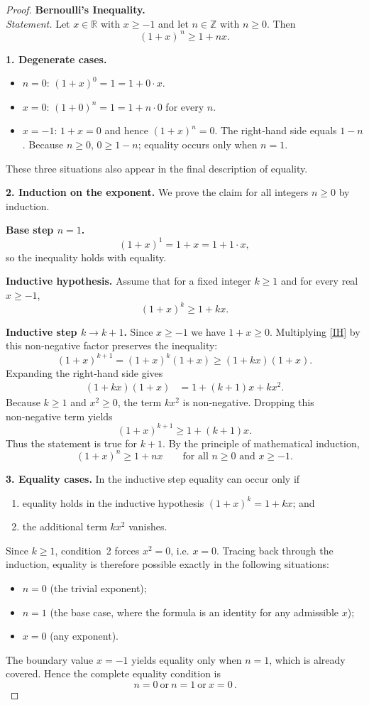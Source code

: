 \begin{proof}
\textbf{Bernoulli’s Inequality.}\\
\textit{Statement.} Let $x\in\mathbb{R}$ with $x\ge -1$ and let $n\in\mathbb{Z}$ with $n\ge 0$. Then
\[
(1+x)^{\,n}\ge 1+ n x .
\]

\medskip
\textbf{1. Degenerate cases.}
\begin{itemize}
\item $n=0$: $(1+x)^{0}=1=1+0\cdot x$.
\item $x=0$: $(1+0)^{n}=1=1+n\cdot0$ for every $n$.
\item $x=-1$: $1+x=0$ and hence $(1+x)^{n}=0$. The right‑hand side equals $1-n$. Because $n\ge0$, $0\ge 1-n$; equality occurs only when $n=1$.
\end{itemize}
These three situations also appear in the final description of equality.

\medskip
\textbf{2. Induction on the exponent.}
We prove the claim for all integers $n\ge0$ by induction.

\textbf{Base step $n=1$.}
\[
(1+x)^{1}=1+x=1+1\cdot x ,
\]
so the inequality holds with equality.

\textbf{Inductive hypothesis.}
Assume that for a fixed integer $k\ge1$ and for every real $x\ge-1$,
\begin{equation}\label{IH}
(1+x)^{k}\ge 1+kx .
\end{equation}

\textbf{Inductive step $k\to k+1$.}
Since $x\ge-1$ we have $1+x\ge0$. Multiplying \eqref{IH} by this non‑negative factor preserves the inequality:
\[
(1+x)^{k+1}= (1+x)^{k}(1+x)\ge (1+kx)(1+x).
\]
Expanding the right‑hand side gives
\begin{align*}
(1+kx)(1+x)&=1+(k+1)x+kx^{2}.
\end{align*}
Because $k\ge1$ and $x^{2}\ge0$, the term $k x^{2}$ is non‑negative. Dropping this non‑negative term yields
\[
(1+x)^{k+1}\ge 1+(k+1)x .
\]
Thus the statement is true for $k+1$. By the principle of mathematical induction,
\[
(1+x)^{n}\ge 1+n x \qquad\text{for all }n\ge0\text{ and }x\ge-1 .
\]

\medskip
\textbf{3. Equality cases.}
In the inductive step equality can occur only if
\begin{enumerate}
\item equality holds in the inductive hypothesis $(1+x)^{k}=1+kx$; and
\item the additional term $k x^{2}$ vanishes.
\end{enumerate}
Since $k\ge1$, condition~2 forces $x^{2}=0$, i.e. $x=0$. Tracing back through the induction, equality is therefore possible exactly in the following situations:
\begin{itemize}
\item $n=0$ (the trivial exponent);
\item $n=1$ (the base case, where the formula is an identity for any admissible $x$);
\item $x=0$ (any exponent).
\end{itemize}
The boundary value $x=-1$ yields equality only when $n=1$, which is already covered. Hence the complete equality condition is
\[
\boxed{\,n=0\ \text{or}\ n=1\ \text{or}\ x=0\,}.
\]


\end{proof}
